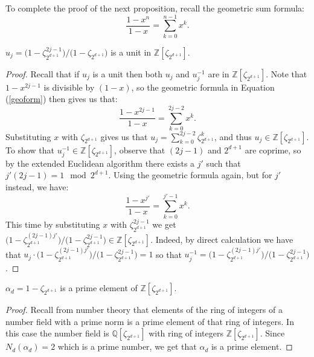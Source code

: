 \documentclass[12pt]{dalthesis}
\begin{document}
To complete the proof of the next proposition, recall the geometric sum formula:
\begin{equation}
\label{geoform}
\frac{1-x^{n}}{1-x} = \sum\limits_{k=0}^{n-1} x^k.
\end{equation}

\begin{proposition}
\label{unit}
$u_j = \big( 1 - \zeta_{2^{d+1}}^{2j - 1} \big)/ \big( 1 - \zeta_{2^{d+1}} \big)$ is a unit in $\mathbb{Z}[\zeta_{2^{d+1}}]$. 
\end{proposition}
\begin{proof}
Recall that if $u_j$ is a unit then both $u_j$ and $u_j^{-1}$ are in $\mathbb{Z}[\zeta_{2^{d+1}}]$. Note that $1-x^{2j-1}$ is divisible by $(1-x)$, so the geometric formula in Equation (\ref{geoform}) then gives us that:
\begin{equation*}
\frac{1-x^{2j-1}}{1-x} = \sum\limits_{k=0}^{2j-2} x^k.
\end{equation*}
Substituting $x$ with $\zeta_{2^{d+1}}$ gives us that $u_j = \sum\limits_{k=0}^{2j-2} \zeta_{2^{d+1}}^k$, and thus $u_j \in \mathbb{Z}[\zeta_{2^{d+1}}]$. To show that $u_j^{-1} \in \mathbb{Z}[\zeta_{2^{d+1}}]$, observe that $(2j-1)$ and $2^{d+1}$ are coprime, so by the extended Euclidean algorithm there exists a $j'$ such that $j'(2j-1) = 1 \mod 2^{d+1}$. Using the geometric formula again, but for $j'$ instead, we have:
\begin{equation*}
\frac{1-x^{j'}}{1-x} = \sum\limits_{k=0}^{j'-1} x^k.
\end{equation*}
This time by substituting $x$ with $\zeta_{2^{d+1}}^{2j-1}$ we get $\big( 1 - \zeta_{2^{d+1}}^{(2j - 1)j'} \big)/ \big( 1 - \zeta_{2^{d+1}}^{2j-1} \big) \in \mathbb{Z}[\zeta_{2^{d+1}}]$. Indeed, by direct calculation we have that $u_j \cdot \big( 1 - \zeta_{2^{d+1}}^{(2j - 1)j'} \big)/ \big( 1 - \zeta_{2^{d+1}}^{2j-1} \big) = 1$ so that $u_j^{-1} = \big( 1 - \zeta_{2^{d+1}}^{(2j - 1)j'} \big)/ \big( 1 - \zeta_{2^{d+1}}^{2j-1} \big)$.
\end{proof}

\begin{proposition}
\label{alphaprime}
$\alpha_d = 1 - \zeta_{2^{d+1}}$ is a prime element of $\mathbb{Z}[\zeta_{2^{d+1}}]$.
\end{proposition}
\begin{proof}
Recall from number theory that elements of the ring of integers of a number field with a prime norm is a prime element of that ring of integers. In this case the number field is $\mathbb{Q}[\zeta_{2^{d+1}}]$ with ring of integers $\mathbb{Z}[\zeta_{2^{d+1}}]$. Since $N_d(\alpha_d) = 2$ which is a prime number, we get that $\alpha_d$ is a prime element.
\end{proof}
\end{document}
